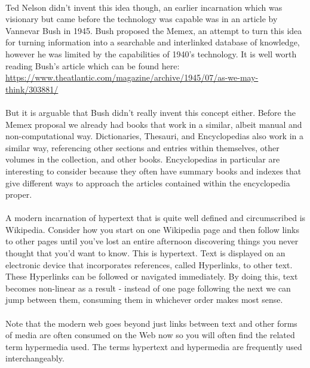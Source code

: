 \documentclass[12pt, a4paper, oneside]{book}
\begin{document}
\paragraph{} Ted Nelson didn't invent this idea though, an earlier incarnation which was visionary but came before the technology was capable was in an article by Vannevar Bush in 1945. Bush proposed the Memex, an attempt to turn this idea for turning information into a searchable and interlinked database of knowledge, however he was limited by the capabilities of 1940's technology. It is well worth reading Bush's article which can be found here:
	\url{https://www.theatlantic.com/magazine/archive/1945/07/as-we-may-think/303881/}

\paragraph{} But it is arguable that Bush didn't really invent this concept either. Before the Memex proposal we already had books that work in a similar, albeit manual and non-computational way. Dictionaries, Thesauri, and Encyclopedias also work in a similar way, referencing other sections and entries within themselves, other volumes in the collection, and other books. Encyclopedias in particular are interesting to consider because they often have summary books and indexes that give different ways to approach the articles contained within the encyclopedia proper.
\paragraph{} A modern incarnation of hypertext that is quite well defined and circumscribed is Wikipedia. Consider how you start on one Wikipedia page and then follow links to other pages until you've lost an entire afternoon discovering things you never thought that you'd want to know. This is hypertext. Text is displayed on an electronic device that incorporates references, called Hyperlinks, to other text. These Hyperlinks can be followed or navigated immediately. By doing this, text becomes non-linear as a result - instead of one page following the next we can jump between them, consuming them in whichever order makes most sense. 
\paragraph{} Note that the modern web goes beyond just links between text and other forms of media are often consumed on the Web now so you will often find the related term hypermedia used. The terms hypertext and hypermedia are frequently used interchangeably.
\end{document}
